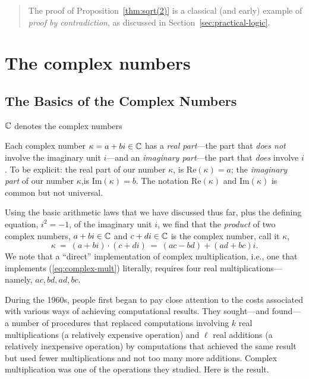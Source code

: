 \begin{quote}
The proof of Proposition~\ref{thm:sqrt(2)} is a classical (and early)
example of {\em proof by contradiction}, as discussed in
Section~\ref{sec:practical-logic}.
\end{quote}



\section{The complex numbers}
\label{sec:complexes}


\subsection{The Basics of the Complex Numbers}

$\mathbb{C}$ denotes the complex numbers

Each complex number $\kappa = a+bi \in \mathbb{C}$ has a {\it real part}---the
part that {\em does not} involve the imaginary unit $i$---and an {\it
  imaginary part}---the part that {\em does} involve $i$.  To be
explicit: the real part of our number $\kappa$, is Re$(\kappa) = a$;
the {\it imaginary part} of our number $\kappa$,is Im$(\kappa) = b$.
The notation Re$(\kappa)$ and Im$(\kappa)$ is common but not
universal.

Using the basic arithmetic laws that we have discussed thus far, plus
the defining equation, $i^2 = -1$, of the imaginary unit $i$, we find
that the {\em product} of two complex numbers, $a+bi \in \mathbb{C}$ and $c+di
\in \mathbb{C}$ is the complex number, call it $\kappa$,
\begin{equation}
\label{eq:complex-mult}
\kappa \ = \ (a+bi) \cdot (c+di) \ = \ (ac - bd) + (ad + bc)i.
\end{equation}
We note that a ``direct'' implementation of complex multiplication,
i.e., one that implements (\ref{eq:complex-mult}) literally, requires
four real multiplications---namely, $ac, bd, ad, bc$.

During the 1960s, people first began to pay close attention to the
costs associated with various ways of achieving computational results.
They sought---and found---a number of procedures that replaced
computations involving $k$ real multiplications (a relatively
expensive operation) and $\ell$ real additions (a relatively
inexpensive operation) by computations that achieved the same result
but used fewer multiplications and not too many more additions.
Complex multiplication was one of the operations they studied.  Here
is the result.

